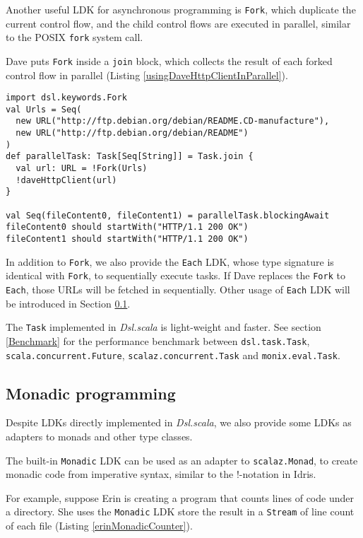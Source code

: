 Another useful LDK for asynchronous programming is \lstinline{Fork}, which duplicate the current control flow, and the child control flows are executed in parallel, similar to the POSIX \lstinline{fork} system call.

Dave puts \lstinline{Fork} inside a \lstinline{join} block, which collects the result of each forked control flow in parallel (Listing \ref{usingDaveHttpClientInParallel}).

\begin{lstlisting}[caption={Using Dave's http client in parallel},label={usingDaveHttpClientInParallel}]
import dsl.keywords.Fork
val Urls = Seq(
  new URL("http://ftp.debian.org/debian/README.CD-manufacture"),
  new URL("http://ftp.debian.org/debian/README")
)
def parallelTask: Task[Seq[String]] = Task.join {
  val url: URL = !Fork(Urls)
  !daveHttpClient(url)
}

val Seq(fileContent0, fileContent1) = parallelTask.blockingAwait
fileContent0 should startWith("HTTP/1.1 200 OK")
fileContent1 should startWith("HTTP/1.1 200 OK")
\end{lstlisting}

In addition to \lstinline{Fork}, we also provide the \lstinline{Each} LDK, whose type signature is identical with \lstinline{Fork}, to sequentially execute tasks. If Dave replaces the \lstinline{Fork} to \lstinline{Each}, those URLs will be fetched in sequentially. Other usage of \lstinline{Each} LDK will be introduced in Section \ref{Monadic programming}.

The \lstinline{Task} implemented in \textit{Dsl.scala} is light-weight and faster. See section \ref{Benchmark} for the performance benchmark between \lstinline{dsl.task.Task}, \lstinline{scala.concurrent.Future}, \lstinline{scalaz.concurrent.Task} and \lstinline{monix.eval.Task}.

\subsection{Monadic programming}\label{Monadic programming}

Despite LDKs directly implemented in \textit{Dsl.scala}, we also provide some LDKs as adapters to monads and other type classes.

The built-in \lstinline{Monadic} LDK can be used as an adapter to \lstinline{scalaz.Monad}, to create monadic code from imperative syntax, similar to the !-notation in Idris.

For example, suppose Erin is creating a program that counts lines of code under a directory. She uses the \lstinline{Monadic} LDK store the result in a \lstinline{Stream} of line count of each file (Listing \ref{erinMonadicCounter}).

